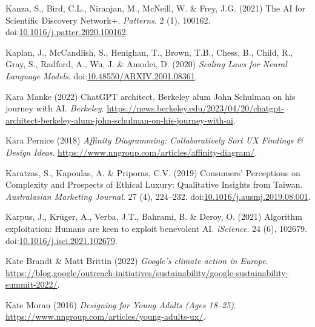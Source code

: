 \documentclass[
  letterpaper,
  DIV=11,
  numbers=noendperiod]{scrartcl}
\newlength{\cslhangindent}
\newenvironment{CSLReferences}[2] %
 {\begin{list}{}{%
  \setlength{\itemindent}{0pt}
  \setlength{\leftmargin}{0pt}
  \setlength{\parsep}{0pt}
  \ifodd #1
   \setlength{\leftmargin}{\cslhangindent}
   \setlength{\itemindent}{-1\cslhangindent}
  \fi
  \setlength{\itemsep}{#2\baselineskip}}}
 {\end{list}}
\begin{document}
\begin{CSLReferences}{0}{1}
Kanza, S., Bird, C.L., Niranjan, M., McNeill, W. \& Frey, J.G. (2021)
The {AI} for {Scientific Discovery Network}+. \emph{Patterns}. 2 (1),
100162.
doi:\href{https://doi.org/10.1016/j.patter.2020.100162}{10.1016/j.patter.2020.100162}.

Kaplan, J., McCandlish, S., Henighan, T., Brown, T.B., Chess, B., Child,
R., Gray, S., Radford, A., Wu, J. \& Amodei, D. (2020) \emph{Scaling
{Laws} for {Neural Language Models}}.
doi:\href{https://doi.org/10.48550/ARXIV.2001.08361}{10.48550/ARXIV.2001.08361}.

Kara Manke (2022) {ChatGPT} architect, {Berkeley} alum {John Schulman}
on his journey with {AI}. \emph{Berkeley}.
\url{https://news.berkeley.edu/2023/04/20/chatgpt-architect-berkeley-alum-john-schulman-on-his-journey-with-ai}.

Kara Pernice (2018) \emph{Affinity {Diagramming}: {Collaboratively Sort
UX Findings} \& {Design Ideas}}.
\url{https://www.nngroup.com/articles/affinity-diagram/}.

Karatzas, S., Kapoulas, A. \& Priporas, C.V. (2019) Consumers'
{Perceptions} on {Complexity} and {Prospects} of {Ethical Luxury}:
{Qualitative Insights} from {Taiwan}. \emph{Australasian Marketing
Journal}. 27 (4), 224--232.
doi:\href{https://doi.org/10.1016/j.ausmj.2019.08.001}{10.1016/j.ausmj.2019.08.001}.

Karpus, J., Krüger, A., Verba, J.T., Bahrami, B. \& Deroy, O. (2021)
Algorithm exploitation: {Humans} are keen to exploit benevolent {AI}.
\emph{iScience}. 24 (6), 102679.
doi:\href{https://doi.org/10.1016/j.isci.2021.102679}{10.1016/j.isci.2021.102679}.

Kate Brandt \& Matt Brittin (2022) \emph{Google's climate action in
{Europe}}.
\url{https://blog.google/outreach-initiatives/sustainability/google-sustainability-summit-2022/}.

Kate Moran (2016) \emph{Designing for {Young Adults} ({Ages} 18--25)}.
\url{https://www.nngroup.com/articles/young-adults-ux/}.


\end{CSLReferences}
\end{document}
